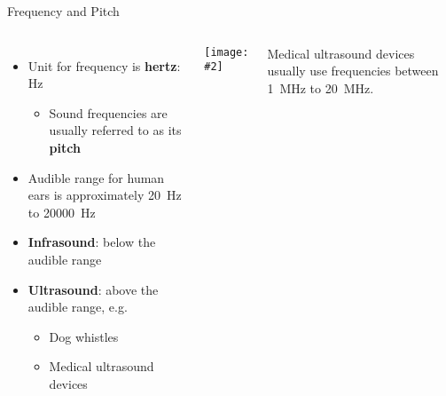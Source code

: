 \documentclass[12pt,compress,aspectratio=169]{beamer}
\newcommand{\pic}[2]{\texttt{[image: \#2]}}
\begin{document}
%
%
%
%    
%
%    
%
%

\begin{frame}{Frequency and Pitch}
  \begin{columns}
    \begin{itemize}
    \item Unit for frequency is \textbf{hertz}: \si{\hertz}
      \begin{itemize}
      \item Sound frequencies are usually referred to as its \textbf{pitch}
      \end{itemize}
    \item Audible range for human ears is approximately \SI{20}{\hertz} to
      \SI{20000}{\hertz}
    \item\textbf{Infrasound}: below the audible range
    \item\textbf{Ultrasound}: above the audible range, e.g.
      \begin{itemize}
      \item Dog whistles
      \item Medical ultrasound devices
      \end{itemize}
    \end{itemize}

    \pic{1}{ultrasound.jpg}\\
    {\footnotesize Medical ultrasound devices usually use frequencies between
    \SI{1}{\mega\hertz} to \SI{20}{\mega\hertz}.\par}
  \end{columns}
\end{frame}
\end{document}
